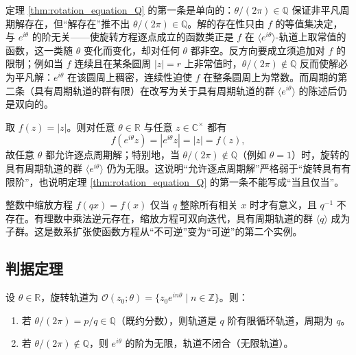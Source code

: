 \begin{remark}\label{rem:rotation_equation_Q_converse}
定理 \ref{thm:rotation_equation_Q} 的第一条是单向的：$\theta/(2\pi)\in\mathbb{Q}$ 保证非平凡周期解存在，但“解存在”推不出 $\theta/(2\pi)\in\mathbb{Q}$。解的存在性只由 $f$ 的等值集决定，与 $e^{i\theta}$ 的阶无关——使旋转方程逐点成立的函数类正是 $f$ 在 $\langle e^{i\theta}\rangle$-轨道上取常值的函数，这一类随 $\theta$ 变化而变化，却对任何 $\theta$ 都非空。反方向要成立须追加对 $f$ 的限制；例如当 $f$ 连续且在某条圆周 $|z|=r$ 上非常值时，$\theta/(2\pi)\notin\mathbb{Q}$ 反而使解必为平凡解：$e^{i\theta}$ 在该圆周上稠密，连续性迫使 $f$ 在整条圆周上为常数。而周期的第二条（具有周期轨道的群有限）在改写为关于具有周期轨道的群 $\langle e^{i\theta}\rangle$ 的陈述后仍是双向的。
\end{remark}

\begin{example}[逐点周期解不蕴含有限阶]\label{ex:rotation_equation_module}
取 $f(z)=|z|$。则对任意 $\theta\in\mathbb{R}$ 与任意 $z\in\mathbb{C}^\times$ 都有
\[
f(e^{i\theta}z)=|e^{i\theta}z|=|z|=f(z),
\]
故任意 $\theta$ 都允许逐点周期解；特别地，当 $\theta/(2\pi)\notin\mathbb{Q}$（例如 $\theta=1$）时，旋转的具有周期轨道的群 $\langle e^{i\theta}\rangle$ 仍为无限。这说明“允许逐点周期解”严格弱于“旋转具有有限阶”，也说明定理 \ref{thm:rotation_equation_Q} 的第一条不能写成“当且仅当”。
\end{example}

\begin{remark}\label{rem:rational_makes_scaling_invertible}
整数中缩放方程 $f(qx)=f(x)$ 仅当 $q$ 整除所有相关 $x$ 时才有意义，且 $q^{-1}$ 不存在。有理数中乘法逆元存在，缩放方程可双向迭代，具有周期轨道的群 $\langle q\rangle$ 成为子群。这是数系扩张使函数方程从“不可逆”变为“可逆”的第二个实例。
\end{remark}

\subsection{\texorpdfstring{判据定理}{判据定理}}

\begin{theorem}[有理数旋转周期判据]\label{thm:rational_rotation_criterion}
设 $\theta \in \mathbb{R}$，旋转轨道为 $\mathcal{O}(z_0;\theta) = \{z_0 e^{in\theta} \mid n\in\mathbb{Z}\}$。则：
\begin{enumerate}[label=(\roman*)]
    \item 若 $\theta/(2\pi) = p/q \in \mathbb{Q}$（既约分数），则轨道是 $q$ 阶有限循环轨道，周期为 $q$。
    \item 若 $\theta/(2\pi) \notin \mathbb{Q}$，则 $e^{i\theta}$ 的阶为无限，轨道不闭合（无限轨道）。
\end{enumerate}
\end{theorem}

